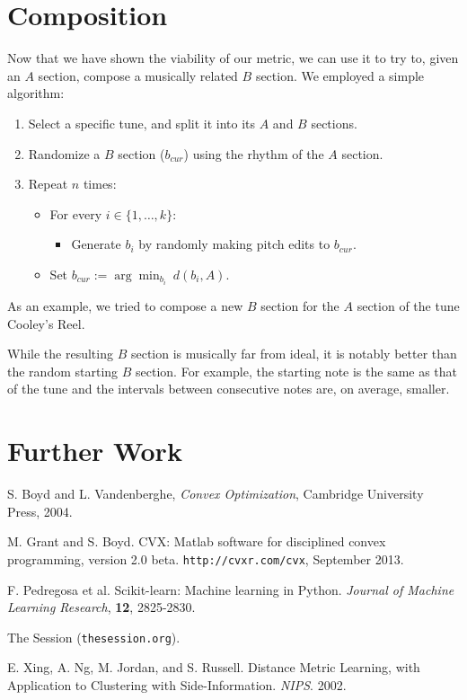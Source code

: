 \documentclass{article} %
\begin{document}
\section{Composition}
Now that we have shown the viability of our metric, we can use it to try to,
given an $A$ section, compose a musically related $B$ section. We employed a
simple algorithm:
\begin{enumerate}
\item Select a specific tune, and split it into its $A$ and $B$ sections.

\item Randomize a $B$ section ($b_{cur}$) using the rhythm of the $A$ section.

\item Repeat $n$ times:
\begin{itemize}\parskip=0.05in
\item[] For every $i \in \{1, \dots, k\}$:
\begin{itemize}
\item[] Generate $b_i$ by randomly making pitch edits to $b_{cur}$.
\end{itemize}
\item[] Set
$\displaystyle{b_{cur} := \arg \min_{b_i} \  d(b_i, A)}$.
\end{itemize}
\end{enumerate}
As an example, we tried to compose a new $B$ section for the $A$ section of the
tune Cooley's Reel. %

While the resulting $B$ section is musically far from ideal, it is notably
better than the random starting $B$ section. For example, the starting note is
the same as that of the tune and the intervals between consecutive notes are, on
average, smaller.

\section{Further Work}



\begin{thebibliography}{9}

S. Boyd and L. Vandenberghe, \textit{Convex Optimization}, Cambridge University
Press, 2004.

M. Grant and S. Boyd. CVX: Matlab software for disciplined convex
programming, version 2.0 beta. \texttt{http://cvxr.com/cvx}, September 2013.

F. Pedregosa et al. Scikit-learn: Machine learning in Python. 
\textit{Journal of Machine Learning Research}, \textbf{12}, 2825-2830.

The Session (\texttt{thesession.org}).

E. Xing, A. Ng, M. Jordan, and S. Russell. Distance Metric Learning, with
Application to Clustering with Side-Information. \textit{NIPS}. 2002.

\end{thebibliography}
\end{document}
